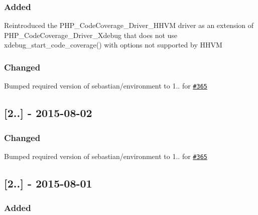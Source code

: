 \subsubsection*{Added}


\begin{DoxyItemize}
\item Reintroduced the {\ttfamily P\+H\+P\+\_\+\+Code\+Coverage\+\_\+\+Driver\+\_\+\+H\+H\+VM} driver as an extension of {\ttfamily P\+H\+P\+\_\+\+Code\+Coverage\+\_\+\+Driver\+\_\+\+Xdebug} that does not use {\ttfamily xdebug\+\_\+start\+\_\+code\+\_\+coverage()} with options not supported by H\+H\+VM
\end{DoxyItemize}

\subsubsection*{Changed}


\begin{DoxyItemize}
\item Bumped required version of {\ttfamily sebastian/environment} to 1.. for \href{https://github.com/sebastianbergmann/php-code-coverage/issues/365}{\tt \#365}
\end{DoxyItemize}

\subsection*{\mbox{[}2..\mbox{]} -\/ 2015-\/08-\/02}

\subsubsection*{Changed}


\begin{DoxyItemize}
\item Bumped required version of {\ttfamily sebastian/environment} to 1.. for \href{https://github.com/sebastianbergmann/php-code-coverage/issues/365}{\tt \#365}
\end{DoxyItemize}

\subsection*{\mbox{[}2..\mbox{]} -\/ 2015-\/08-\/01}

\subsubsection*{Added}


